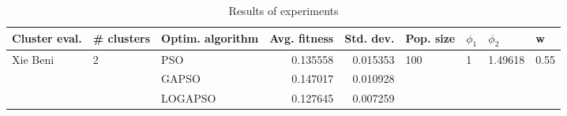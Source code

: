 \begin{table}
\centering
\caption{Results of experiments}
\begin{tabular}{lllrrllll}
\toprule
            Cluster eval. &        \# clusters & Optim. algorithm &  Avg. fitness &  Std. dev. &            Pop. size &         $\phi_{1}$ &               $\phi_{2}$ &                     w \\
\midrule
\multirow{3}{*}{Xie Beni} & \multirow{3}{*}{2} &              PSO &      0.135558 &   0.015353 & \multirow{3}{*}{100} & \multirow{3}{*}{1} & \multirow{3}{*}{1.49618} & \multirow{3}{*}{0.55} \\
                          &                    &            GAPSO &      0.147017 &   0.010928 &                      &                    &                          &                       \\
                          &                    &          LOGAPSO &      0.127645 &   0.007259 &                      &                    &                          &                       \\
\bottomrule
\end{tabular}
\end{table}
